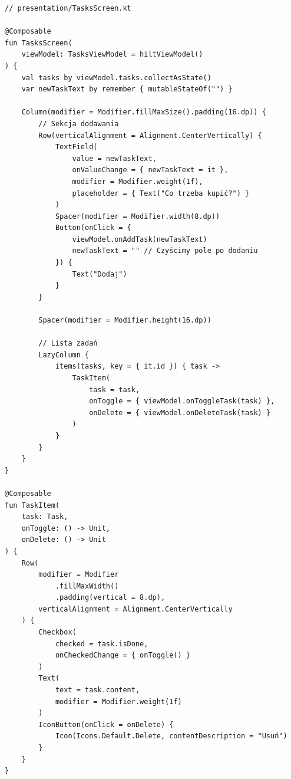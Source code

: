 \begin{verbatim}
// presentation/TasksScreen.kt

@Composable
fun TasksScreen(
    viewModel: TasksViewModel = hiltViewModel()
) {
    val tasks by viewModel.tasks.collectAsState()
    var newTaskText by remember { mutableStateOf("") }

    Column(modifier = Modifier.fillMaxSize().padding(16.dp)) {
        // Sekcja dodawania
        Row(verticalAlignment = Alignment.CenterVertically) {
            TextField(
                value = newTaskText,
                onValueChange = { newTaskText = it },
                modifier = Modifier.weight(1f),
                placeholder = { Text("Co trzeba kupić?") }
            )
            Spacer(modifier = Modifier.width(8.dp))
            Button(onClick = {
                viewModel.onAddTask(newTaskText)
                newTaskText = "" // Czyścimy pole po dodaniu
            }) {
                Text("Dodaj")
            }
        }

        Spacer(modifier = Modifier.height(16.dp))

        // Lista zadań
        LazyColumn {
            items(tasks, key = { it.id }) { task ->
                TaskItem(
                    task = task,
                    onToggle = { viewModel.onToggleTask(task) },
                    onDelete = { viewModel.onDeleteTask(task) }
                )
            }
        }
    }
}

@Composable
fun TaskItem(
    task: Task,
    onToggle: () -> Unit,
    onDelete: () -> Unit
) {
    Row(
        modifier = Modifier
            .fillMaxWidth()
            .padding(vertical = 8.dp),
        verticalAlignment = Alignment.CenterVertically
    ) {
        Checkbox(
            checked = task.isDone,
            onCheckedChange = { onToggle() }
        )
        Text(
            text = task.content,
            modifier = Modifier.weight(1f)
        )
        IconButton(onClick = onDelete) {
            Icon(Icons.Default.Delete, contentDescription = "Usuń")
        }
    }
}
\end{verbatim}
